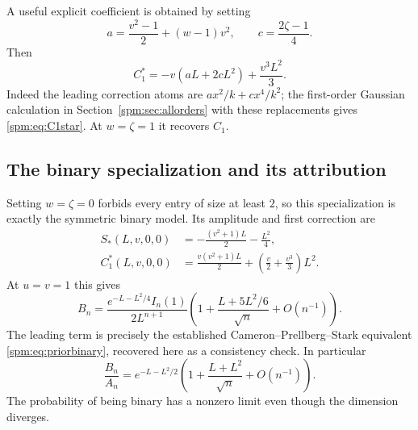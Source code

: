 A useful explicit coefficient is obtained by setting
\[
 a=\frac{v^2-1}{2}+(w-1)v^2,\qquad c=\frac{2\zeta-1}{4}.
\]
Then
\begin{equation}\label{spm:eq:C1star}
 C_1^*=-v(aL+2cL^2)+\frac{v^3L^2}{3}.
\end{equation}
Indeed the leading correction atoms are $ax^2/k+cx^4/k^2$; the first-order Gaussian calculation in Section~\ref{spm:sec:allorders} with these replacements gives \eqref{spm:eq:C1star}. At $w=\zeta=1$ it recovers $C_1$.

\subsection{The binary specialization and its attribution}
Setting $w=\zeta=0$ forbids every entry of size at least $2$, so this specialization is exactly the symmetric binary model. Its amplitude and first correction are
\begin{align}
 S_*(L,v,0,0)&=-\frac{(v^2+1)L}{2}-\frac{L^2}{4},\label{spm:eq:binaryS}\\
 C_1^*(L,v,0,0)&=\frac{v(v^2+1)L}{2}
                   +\left(\frac v2+\frac{v^3}{3}\right)L^2.\label{spm:eq:binaryC1}
\end{align}
At $u=v=1$ this gives
\begin{equation}\label{spm:eq:binaryrefined}
 B_n=\frac{e^{-L-L^2/4}I_n(1)}{2L^{n+1}}
 \left(1+\frac{L+5L^2/6}{\sqrt n}+O(n^{-1})\right).
\end{equation}
The leading term is precisely the established Cameron--Prellberg--Stark equivalent \eqref{spm:eq:priorbinary}, recovered here as a consistency check. In particular
\begin{equation}\label{spm:eq:binaryprob}
 \frac{B_n}{A_n}
 =e^{-L-L^2/2}\left(1+\frac{L+L^2}{\sqrt n}+O(n^{-1})\right).
\end{equation}
The probability of being binary has a nonzero limit even though the dimension diverges.
